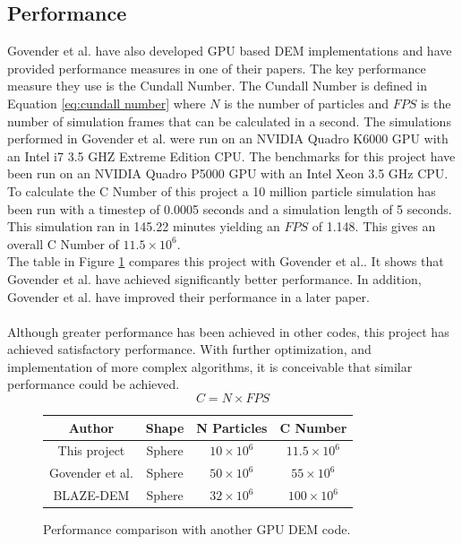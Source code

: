 \documentclass[10pt,a4paper,titlepage]{report}
\begin{document}
\subsection{Performance}
Govender et al. have also developed GPU based DEM implementations and have provided performance measures in one of their papers\cite{performance}. The key performance measure they use is the Cundall Number. The Cundall Number is defined in Equation \ref{eq:cundall number} where $N$ is the number of particles and $FPS$ is the number of simulation frames that can be calculated in a second. The simulations performed in Govender et al.\cite{performance} were run on an NVIDIA Quadro K6000 GPU with an Intel i7 3.5 GHZ Extreme Edition CPU. The benchmarks for this project have been run on an NVIDIA Quadro P5000 GPU with an  Intel Xeon 3.5 GHz CPU.
\\To calculate the C Number of this project a 10 million particle simulation has been run with a timestep of 0.0005 seconds and a simulation length of 5 seconds. This simulation ran in 145.22 minutes yielding an $FPS$ of 1.148. This gives an overall C Number of $11.5 \times 10^6$.
\\The table in Figure \ref{fig:performance comparison} compares this project with Govender et al.\cite{performance}. It shows that Govender et al. have achieved significantly better performance. In addition, Govender et al. have improved their performance in a later paper\cite{blazedem}.
\\\\Although greater performance has been achieved in other codes, this project has achieved satisfactory performance. With further optimization, and implementation of more complex algorithms, it is conceivable that similar performance could be achieved.
\begin{equation}
C = N \times FPS
\label{eq:cundall number}
\end{equation}

\begin{figure}
\begin{center}
\begin{tabular}{|c c c c|}
\hline
Author & Shape & N Particles & C Number\\
\hline
This project & Sphere & $10 \times 10^6$ & $11.5 \times 10^6$ \\
Govender et al.\cite{performance} & Sphere & $50 \times 10^6$ & $55 \times 10^6$ \\
BLAZE-DEM\cite{blazedem} & Sphere & $32 \times 10^6$ & $100 \times 10^6$ \\
\hline
\end{tabular}
\end{center}
\caption{Performance comparison with another GPU DEM code.}
\label{fig:performance comparison}
\end{figure}
\end{document}
